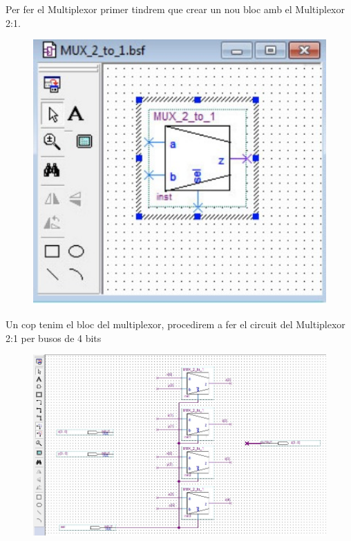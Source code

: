 \documentclass[12pt, a4papre]{article}
\begin{document}
	Per fer el Multiplexor primer tindrem que crear un nou bloc amb el Multiplexor 2:1.
	
	\begin{figure}[H]
		\begin{center}
		\includegraphics[width=150mm]{blocmultiplexor.jpeg}
		\end{center}
	\end{figure}
		
	Un cop tenim el bloc del multiplexor, procedirem a fer el circuit del Multiplexor 2:1 per busos de 4 bits
		\begin{figure}[H]
		\begin{center}
		\includegraphics[width=150mm]{mult4bits.jpeg}
		\end{center}
	\end{figure}
	
\end{document}
